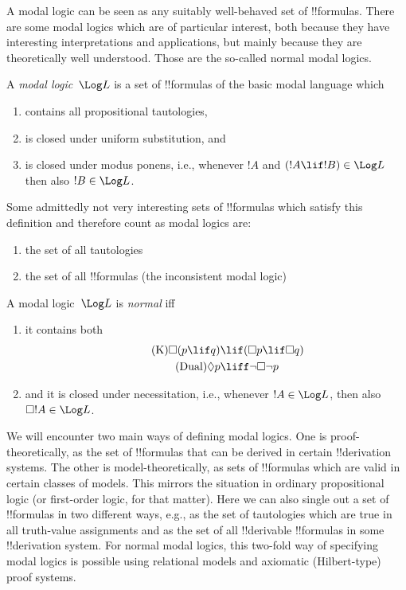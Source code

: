 \documentclass[../../../include/open-logic-section]{subfiles}
\begin{document}


A modal logic can be seen as any suitably well-behaved set of
!!{formula}s.  There are some modal logics which are of particular
interest, both because they have interesting interpretations and
applications, but mainly because they are theoretically well
understood.  Those are the so-called normal modal logics.

\begin{defn}
A \emph{modal logic}~$\Log L$ is a set of !!{formula}s of the basic
modal language which 
\begin{enumerate}
\item contains all propositional tautologies, 
\item is closed under uniform substitution, and 
\item is closed under modus ponens, i.e., whenever $!A$ and $(!A \lif
  !B) \in \Log L$ then also $!B \in \Log L$.
\end{enumerate}
\end{defn}

\begin{ex}
Some admittedly not very interesting sets of !!{formula}s which
satisfy this definition and therefore count as modal logics are:
\begin{enumerate}
\item the set of all tautologies
\item the set of all !!{formula}s (the inconsistent modal logic)
\end{enumerate}
\end{ex}

\begin{defn}\label{defn:normal-modal-logic}
A modal logic~$\Log L$ is \emph{normal} iff 
\begin{enumerate}
\item it contains both
\begin{align}
\tag{K} \Box(p \lif q) & \lif (\Box p \lif \Box q) \\
\tag{Dual} \Diamond p & \liff \lnot \Box \lnot p
\end{align}
\item and it is closed under necessitation, i.e., whenever $!A \in
  \Log L$, then also $\Box !A \in \Log L$.
\end{enumerate}
\end{defn}

We will encounter two main ways of defining modal logics.  One is
proof-theoretically, as the set of !!{formula}s that can be derived in
certain !!{derivation} systems. The other is model-theoretically, as
sets of !!{formula}s which are valid in certain classes of
models. This mirrors the situation in ordinary propositional logic (or
first-order logic, for that matter).  Here we can also single out a
set of !!{formula}s in two different ways, e.g., as the set of
tautologies which are true in all truth-value assignments and as the
set of all !!{derivable} !!{formula}s in some !!{derivation} system.
For normal modal logics, this two-fold way of specifying modal logics
is possible using relational models and axiomatic (Hilbert-type) proof
systems.
\end{document}
